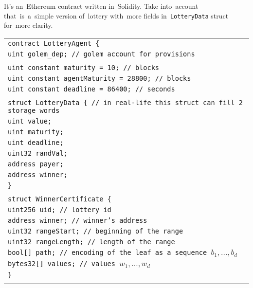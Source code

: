 \documentclass[a4paper]{article}
\begin{document}
    It's an~Ethereum contract written in~Solidity. Take into~account that~is~a~simple version of~lottery with~more
    fields in~\texttt{LotteryData} struct for~more clarity.

    \begin{tabularx}{\linewidth}{l}
        \texttt{contract LotteryAgent \{}\\
        \qquad\texttt{uint golem\_dep;  // golem account for~provisions}\\
        \\
        \qquad\texttt{uint constant maturity = 10; // blocks}\\
        \qquad\texttt{uint constant agentMaturity = 28800; // blocks}\\
        \qquad\texttt{uint constant deadline = 86400; // seconds}\\
        \\
        \qquad\texttt{struct LotteryData \{  // in~real-life this struct can fill 2 storage words}\\
        \qquad\qquad\texttt{uint value;}\\
        \qquad\qquad\texttt{uint maturity;}\\
        \qquad\qquad\texttt{uint deadline;}\\
        \qquad\qquad\texttt{uint32 randVal;}\\
        \qquad\qquad\texttt{address payer;}\\
        \qquad\qquad\texttt{address winner;}\\
        \qquad\texttt{\}}\\
        \\
        \qquad\texttt{struct WinnerCertificate \{}\\
        \qquad\qquad\texttt{uint256 uid;        // lottery id}\\
        \qquad\qquad\texttt{address winner;     // winner's address}\\
        \qquad\qquad\texttt{uint32 rangeStart;  // beginning of~the~range}\\
        \qquad\qquad\texttt{uint32 rangeLength; // length of~the~range}\\
        \qquad\qquad\texttt{bool[] path;        // encoding of~the~leaf as a~sequence $b_1, \ldots, b_d$}\\
        \qquad\qquad\texttt{bytes32[] values;   // values $w_1, \ldots, w_d$}\\
        \qquad\texttt{\}}\\
        \\

\end{tabularx}
\end{document}
